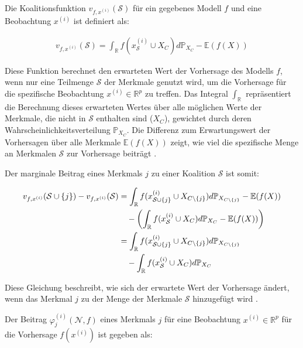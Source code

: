 Die Koalitionsfunktion $v_{f, x^{(i)}}(\mathcal{S})$ für ein gegebenes Modell $f$ und eine Beobachtung $x^{(i)}$ ist definiert als:

\begin{align}
    \label{eq:shap-value-func}
    v_{f, x^{(i)}}(\mathcal{S}) = \int_{\mathbb{R}} f(x^{(i)}_{\mathcal{S}} \cup X_{C}) d\mathbb{P}_{X_{C}} - \mathbb{E}(f(X))
\end{align}

Diese Funktion berechnet den erwarteten Wert der Vorhersage des Modells $f$, wenn nur eine Teilmenge $\mathcal{S}$ der 
Merkmale genutzt wird, um die Vorhersage für die spezifische Beobachtung $x^{(i)} \in \mathbb{R}^{p}$ zu treffen. 
Das Integral $\int_{\mathbb{R}}$ repräsentiert die Berechnung dieses erwarteten Wertes über alle möglichen Werte der Merkmale, 
die nicht in $\mathcal{S}$ enthalten sind ($X_C$), gewichtet durch deren Wahrscheinlichkeitsverteilung $\mathbb{P}_{X_{C}}$. 
Die Differenz zum Erwartungswert der Vorhersagen über alle Merkmale $\mathbb{E}(f(X))$ zeigt, 
wie viel die spezifische Menge an Merkmalen $\mathcal{S}$ zur Vorhersage beiträgt \cite[S. 221, S. 27]{Molnar_2022, Molnar_2023}.

Der marginale Beitrag eines Merkmals $j$ zu einer Koalition $\mathcal{S}$ ist somit:

\begin{align}
    \label{eq:shap-marginal-func}
    v_{f, x^{(i)}}(\mathcal{S} \cup \{j\}) - v_{f, x^{(i)}}(\mathcal{S}) &= \int_{\mathbb{R}} f(x^{(i)}_{\mathcal{S} \cup \{j\}} \cup X_{C \setminus \{j\}}) d\mathbb{P}_{X_{C \setminus \{j\}}} - \mathbb{E}(f(X)) \\ \notag
    &\quad - \left( \int_{\mathbb{R}} f(x^{(i)}_{\mathcal{S}} \cup X_{C}) d\mathbb{P}_{X_{C}} - \mathbb{E}(f(X)) \right) \\ \notag
    &= \int_{\mathbb{R}} f(x^{(i)}_{\mathcal{S} \cup \{j\}} \cup X_{C \setminus \{j\}}) d\mathbb{P}_{X_{C \setminus \{j\}}} \\ \notag
    &\quad - \int_{\mathbb{R}} f(x^{(i)}_{\mathcal{S}} \cup X_{C}) d\mathbb{P}_{X_{C}}
\end{align}

Diese Gleichung beschreibt, wie sich der erwartete Wert der Vorhersage ändert, wenn das Merkmal $j$ zu der Menge der Merkmale $\mathcal{S}$ hinzugefügt wird \cite[S. 29]{Molnar_2023}.

Der Beitrag $\varphi_j^{(i)}(\mathcal{N}, f)$ eines Merkmals $j$ für eine Beobachtung $x^{(i)} \in \mathbb{R}^{p}$ für die Vorhersage $f(x^{(i)})$ ist gegeben als:

